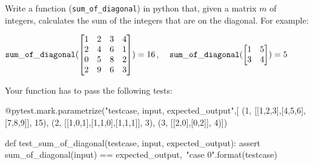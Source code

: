 \begin{exercise}
Write a function ({\tt sum\_of\_diagonal}) in python that, given a matrix $m$ of integers, calculates the sum of the integers that are on the diagonal.
For example:

$
{\tt sum\_of\_diagonal}(
\begin{bmatrix}
    1 & 2 & 3 & 4 \\
    2 & 4 & 6 & 1 \\
    0 & 5 & 8 & 2 \\
    2 & 9 & 6 & 3 \\
\end{bmatrix})
 = 16
$, $\;\;$
$
{\tt sum\_of\_diagonal}(
\begin{bmatrix}
    1 & 5   \\
    3 & 4  \\
\end{bmatrix})
 = 5
$

Your function has to pass the following tests:

\begin{small}
\begin{python}
@pytest.mark.parametrize("testcase, input, expected_output",[
(1, [[1,2,3],[4,5,6],[7,8,9]], 15),
(2, [[1,0,1],[1,1,0],[1,1,1]], 3),
(3, [[2,0],[0,2]], 4)])

def test_sum_of_diagonal(testcase, input, expected_output):
    assert sum_of_diagonal(input) == expected_output,\
           "case {0}".format(testcase)
\end{python}
\end{small}


\end{exercise}
